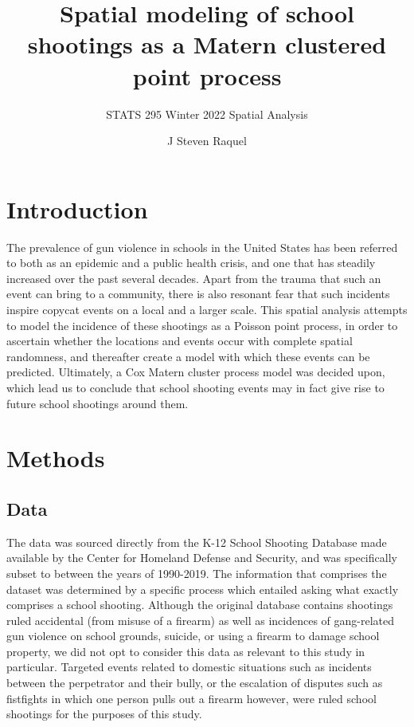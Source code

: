 \documentclass[
  12pt,
]{article}
\title{Spatial modeling of school shootings as a Matern clustered point
process}
\subtitle{STATS 295 Winter 2022 Spatial Analysis}
\author{J Steven Raquel}
\date{}
\begin{document}
\maketitle

\hypertarget{introduction}{%
\section{Introduction}\label{introduction}}

The prevalence of gun violence in schools in the United States has been
referred to both as an epidemic and a public health crisis, and one that
has steadily increased over the past several decades. Apart from the
trauma that such an event can bring to a community, there is also
resonant fear that such incidents inspire copycat events on a local and
a larger scale. This spatial analysis attempts to model the incidence of
these shootings as a Poisson point process, in order to ascertain
whether the locations and events occur with complete spatial randomness,
and thereafter create a model with which these events can be predicted.
Ultimately, a Cox Matern cluster process model was decided upon, which
lead us to conclude that school shooting events may in fact give rise to
future school shootings around them.

\hypertarget{methods}{%
\section{Methods}\label{methods}}

\hypertarget{data}{%
\subsection{Data}\label{data}}

The data was sourced directly from the K-12 School Shooting Database
made available by the Center for Homeland Defense and Security, and was
specifically subset to between the years of 1990-2019. The information
that comprises the dataset was determined by a specific process which
entailed asking what exactly comprises a school shooting. Although the
original database contains shootings ruled accidental (from misuse of a
firearm) as well as incidences of gang-related gun violence on school
grounds, suicide, or using a firearm to damage school property, we did
not opt to consider this data as relevant to this study in particular.
Targeted events related to domestic situations such as incidents between
the perpetrator and their bully, or the escalation of disputes such as
fistfights in which one person pulls out a firearm however, were ruled
school shootings for the purposes of this study.
\end{document}
